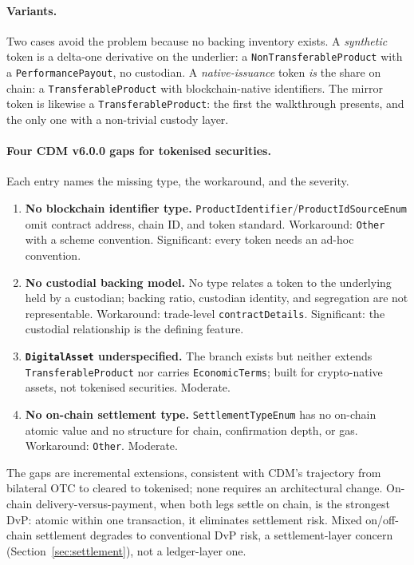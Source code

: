 \paragraph{Variants.} Two cases avoid the problem because no backing inventory exists. A \emph{synthetic} token is a delta-one derivative on the underlier: a \texttt{Non\allowbreak Transferable\allowbreak Product} with a \texttt{PerformancePayout}, no custodian. A \emph{native-issuance} token \emph{is} the share on chain: a \texttt{Transferable\allowbreak Product} with blockchain-native identifiers. The mirror token is likewise a \texttt{Transferable\allowbreak Product}: the first the walkthrough presents, and the only one with a non-trivial custody layer.

\paragraph{Four CDM v6.0.0 gaps for tokenised securities.}
Each entry names the missing type, the workaround, and the severity.
\begin{enumerate}[nosep]
\item \textbf{No blockchain identifier type.} \texttt{ProductIdentifier}/\texttt{ProductIdSourceEnum} omit contract address, chain ID, and token standard. Workaround: \texttt{Other} with a scheme convention. Significant: every token needs an ad-hoc convention.
\item \textbf{No custodial backing model.} No type relates a token to the underlying held by a custodian; backing ratio, custodian identity, and segregation are not representable. Workaround: trade-level \texttt{contractDetails}. Significant: the custodial relationship is the defining feature.
\item \textbf{\texttt{DigitalAsset} underspecified.} The branch exists but neither extends \texttt{Transferable\allowbreak Product} nor carries \texttt{EconomicTerms}; built for crypto-native assets, not tokenised securities. Moderate.
\item \textbf{No on-chain settlement type.} \texttt{SettlementTypeEnum} has no on-chain atomic value and no structure for chain, confirmation depth, or gas. Workaround: \texttt{Other}. Moderate.
\end{enumerate}
The gaps are incremental extensions, consistent with CDM's trajectory from bilateral OTC to cleared to tokenised; none requires an architectural change. On-chain delivery-versus-payment, when both legs settle on chain, is the strongest DvP: atomic within one transaction, it eliminates settlement risk. Mixed on/off-chain settlement degrades to conventional DvP risk, a settlement-layer concern (Section~\ref{sec:settlement}), not a ledger-layer one.

